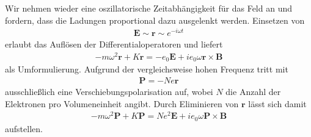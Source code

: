 Wir nehmen wieder eine oszillatorische Zeitabhängigkeit für das Feld an und fordern, dass die Ladungen proportional dazu
ausgelenkt werden. Einsetzen von
\begin{align*}
    \bm{E} \sim \bm{r} \sim e^{-i\omega t}
\end{align*}
erlaubt das Auflösen der Differentialoperatoren und liefert
\begin{align*}
    -m\omega^2 \bm{r} + K\bm{r} = -e_0\bm{E} + i e_0 \omega \bm{r} \times \bm{B}
\end{align*}
als Umformulierung. Aufgrund der vergleichsweise hohen Frequenz tritt mit
\begin{align*}
    \bm{P} = -Ne\bm{r}
\end{align*}
ausschließlich eine Verschiebungspolarisation auf, wobei $N$ die Anzahl der Elektronen pro Volumeneinheit angibt.
Durch Eliminieren von $\bm{r}$ lässt sich damit
\begin{align*}
    -m\omega^2 \bm{P} + K\bm{P} = Ne^2\bm{E} + i e_0 \omega \bm{P} \times \bm{B}
\end{align*}
aufstellen. \enlargethispage{\baselineskip}\pagebreak

